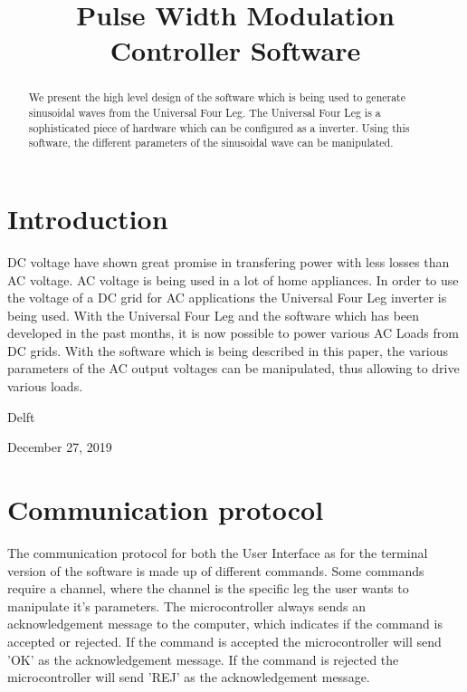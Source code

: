 \documentclass[conference]{IEEEtran}
\begin{document}
\title{Pulse Width Modulation Controller Software}


\author{
\and
{}
\and
{}
}


\maketitle


\begin{abstract}
We present the high level design of the software which is being used to generate sinusoidal waves from the Universal Four Leg. The Universal Four Leg is a sophisticated piece of hardware which can be configured as a inverter. Using this software, the different parameters of the sinusoidal wave can be manipulated.
\end{abstract}


\IEEEpeerreviewmaketitle



\section{Introduction}
DC voltage have shown great promise in transfering power with less losses than AC voltage. AC voltage is being used in a lot of home appliances. In order to use the voltage of a DC grid for AC applications the Universal Four Leg inverter is being used. With the Universal Four Leg and the software which has been developed in the past months, it is now possible to power various AC Loads from DC grids. With the software which is being described in this paper, the various parameters of the AC output voltages can be manipulated, thus allowing to drive various loads. 

\hfill Delft
 
\hfill December 27, 2019

\section{Communication protocol}
The communication protocol for both the User Interface as for the terminal version of the software is made up of different commands. Some commands require a channel, where the channel is the specific leg the user wants to manipulate it's parameters. The microcontroller always sends an acknowledgement message to the computer, which indicates if the command is accepted or rejected. If the command is accepted the microcontroller will send 'OK' as the acknowledgement message. If the command is rejected the microcontroller will send 'REJ' as the acknowledgement message.
\end{document}
